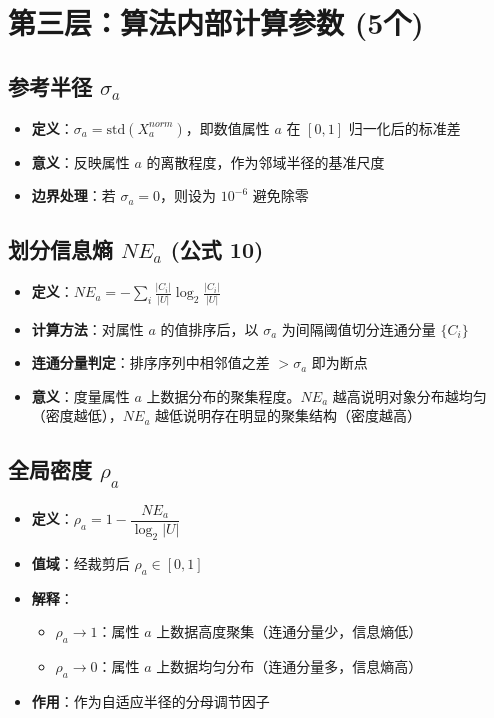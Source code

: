 \documentclass[11pt,a4paper]{ctexart}
\begin{document}
\section{第三层：算法内部计算参数 (5个)}

\subsection{参考半径 $\sigma_a$}

\begin{itemize}[leftmargin=*]
    \item \textbf{定义}：$\sigma_a = \text{std}(X_a^{norm})$，即数值属性 $a$ 在 $[0,1]$ 归一化后的标准差
    \item \textbf{意义}：反映属性 $a$ 的离散程度，作为邻域半径的基准尺度
    \item \textbf{边界处理}：若 $\sigma_a = 0$，则设为 $10^{-6}$ 避免除零
\end{itemize}

\subsection{划分信息熵 $NE_a$ (公式 10)}

\begin{itemize}[leftmargin=*]
    \item \textbf{定义}：$NE_a = -\sum_{i} \frac{|C_i|}{|U|} \log_2 \frac{|C_i|}{|U|}$
    \item \textbf{计算方法}：对属性 $a$ 的值排序后，以 $\sigma_a$ 为间隔阈值切分连通分量 $\{C_i\}$
    \item \textbf{连通分量判定}：排序序列中相邻值之差 $> \sigma_a$ 即为断点
    \item \textbf{意义}：度量属性 $a$ 上数据分布的聚集程度。$NE_a$ 越高说明对象分布越均匀（密度越低），$NE_a$ 越低说明存在明显的聚集结构（密度越高）
\end{itemize}

\subsection{全局密度 $\rho_a$}

\begin{itemize}[leftmargin=*]
    \item \textbf{定义}：$\rho_a = 1 - \dfrac{NE_a}{\log_2|U|}$
    \item \textbf{值域}：经裁剪后 $\rho_a \in [0, 1]$
    \item \textbf{解释}：
    \begin{itemize}
        \item $\rho_a \to 1$：属性 $a$ 上数据高度聚集（连通分量少，信息熵低）
        \item $\rho_a \to 0$：属性 $a$ 上数据均匀分布（连通分量多，信息熵高）
    \end{itemize}
    \item \textbf{作用}：作为自适应半径的分母调节因子
\end{itemize}
\end{document}
